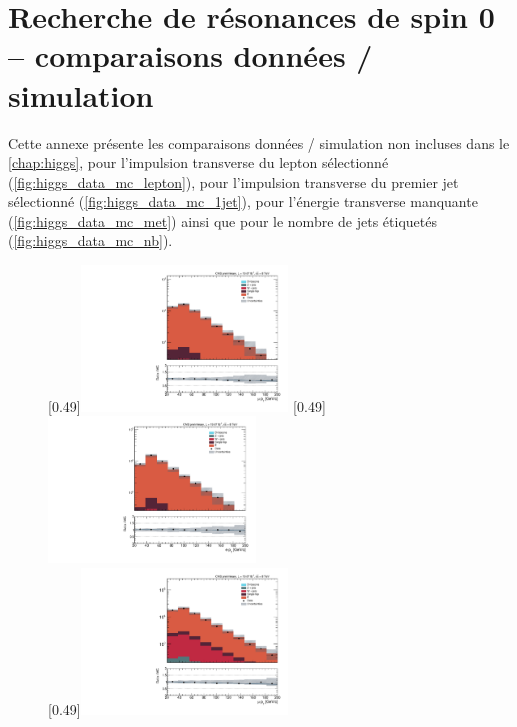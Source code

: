 \chapter{Recherche de résonances de spin 0 -- comparaisons données / simulation} \label{an:higgs_data_mc}

Cette annexe présente les comparaisons données / simulation non incluses dans le \cref{chap:higgs}, pour l'impulsion transverse du lepton sélectionné (\cref{fig:higgs_data_mc_lepton}), pour l'impulsion transverse du premier jet sélectionné (\cref{fig:higgs_data_mc_1jet}), pour l'énergie transverse manquante (\cref{fig:higgs_data_mc_met}) ainsi que pour le nombre de jets étiquetés \Pbottom (\cref{fig:higgs_data_mc_nb}).

\begin{figure}[p!] \centering
    [0.49\textwidth]{\includegraphics[width=0.49\textwidth,angle=-90,origin=c]{annexes/figs/higgs/data_mc/2-btag/semimu/leptonPt_reco_fullsel.pdf}} \hfill
    [0.49\textwidth]{\includegraphics[width=0.49\textwidth,angle=-90,origin=c]{annexes/figs/higgs/data_mc/2-btag/semie/leptonPt_reco_fullsel.pdf}} \\ \vspace{5mm}
    [0.49\textwidth]{\includegraphics[width=0.49\textwidth,angle=-90,origin=c]{annexes/figs/higgs/data_mc/1-btag/semimu/leptonPt_reco_fullsel.pdf}} \hfill

\end{figure}
